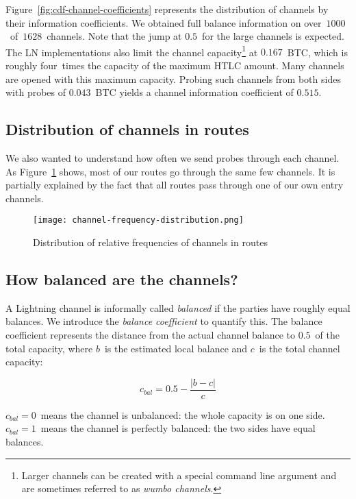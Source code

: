 Figure~\ref{fig:cdf-channel-coefficients} represents the distribution of channels by their information coefficients.
We obtained full balance information on over~$1000$~of~$1628$~channels.
Note that the jump at $0.5$~for the large channels is expected.
The LN implementations also limit the channel capacity\footnote{Larger channels can be created with a special command line argument and are sometimes referred to as \textit{wumbo channels}.} at $0.167$~BTC, which is roughly four~times the capacity of the maximum HTLC amount.
Many channels are opened with this maximum capacity.
Probing such channels from both sides with probes of $0.043$~BTC yields a channel information coefficient of $0.515$.


\subsection{Distribution of channels in routes}

We also wanted to understand how often we send probes through each channel.
As Figure~\ref{fig:channel-frequency-distribution} shows, most of our routes go through the same few channels.
It is partially explained by the fact that all routes pass through one of our own entry channels.

\begin{figure}[h]
	\centering
	\texttt{[image: channel-frequency-distribution.png]}
	\caption{Distribution of relative frequencies of channels in routes}
	\label{fig:channel-frequency-distribution}
\end{figure}


\subsection{How balanced are the channels?}

A Lightning channel is informally called \textit{balanced} if the parties have roughly equal balances.
We introduce the \textit{balance coefficient} to quantify this.
The balance coefficient represents the distance from the actual channel balance to $0.5$~of the total capacity, where $b$~is the estimated local balance and $c$~is the total channel capacity:

\[c_{bal} = 0.5 - \frac{|b-c|}{c} \]

$c_{bal} = 0$~means the channel is unbalanced: the whole capacity is on one side.
$c_{bal} = 1$~means the channel is perfectly balanced: the two sides have equal balances.

